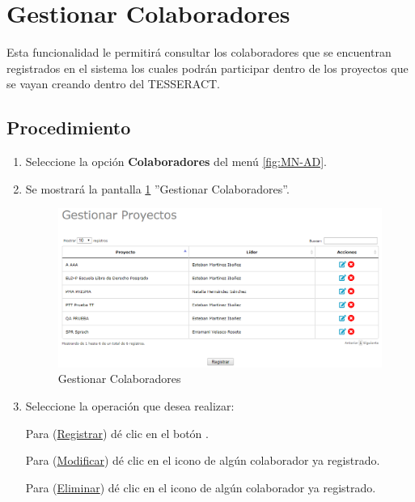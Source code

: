 \hypertarget{cv:GestionarColaboradores}{\section{Gestionar Colaboradores}} \label{sec:GestionarColaboradores}

	Esta funcionalidad le permitirá consultar los colaboradores que se encuentran registrados en el sistema los cuales podrán participar dentro de los proyectos que se vayan creando dentro del TESSERACT.

		\subsection{Procedimiento}

			\begin{enumerate}
	
			\item Seleccione la opción \textbf{Colaboradores} del menú \ref{fig:MN-AD}.
	
			\item Se mostrará la pantalla \ref{fig:GestionarColaboradores} ''Gestionar Colaboradores''.

			\begin{figure}[htbp!]
				\begin{center}
					\includegraphics[scale=0.5]{images/inicioSesion/IU2GestionProyectos}
					\caption{Gestionar Colaboradores}
					\label{fig:GestionarColaboradores}
				\end{center}
			\end{figure}
		
			\item Seleccione la operación que desea realizar:
			
			Para (\hyperlink{cv:registrarColaborador}{Registrar}) dé clic en el botón \IURegistrar.
			
			Para (\hyperlink{cv:modificarColaborador}{Modificar}) dé clic en el icono \IUEditar{} de algún colaborador ya registrado.
			
			Para (\hyperlink{cv:VisualizarTrayDocente_SP}{Eliminar}) dé clic en el icono \IUBotonEliminar{} de algún colaborador ya registrado. 
			
			
			\end{enumerate}